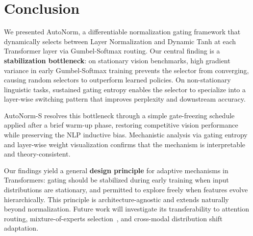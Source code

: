 \documentclass[conference]{IEEEtran}
\begin{document}
\section{Conclusion}

We presented AutoNorm, a differentiable normalization gating framework
that dynamically selects between Layer Normalization and Dynamic Tanh
at each Transformer layer via Gumbel-Softmax routing. Our central
finding is a \textbf{stabilization bottleneck}: on stationary vision
benchmarks, high gradient variance in early Gumbel-Softmax training
prevents the selector from converging, causing random selectors to
outperform learned policies. On non-stationary linguistic tasks,
sustained gating entropy enables the selector to specialize into a
layer-wise switching pattern that improves perplexity and downstream
accuracy.

AutoNorm-S resolves this bottleneck through a simple gate-freezing
schedule applied after a brief warm-up phase, restoring competitive
vision performance while preserving the NLP inductive bias. Mechanistic
analysis via gating entropy and layer-wise weight visualization
confirms that the mechanism is interpretable and theory-consistent.

Our findings yield a general \textbf{design principle} for adaptive
mechanisms in Transformers: gating should be stabilized during early
training when input distributions are stationary, and permitted to
explore freely when features evolve hierarchically. This principle is
architecture-agnostic and extends naturally beyond normalization.
Future work will investigate its transferability to attention routing,
mixture-of-experts selection~\cite{shazeer2017outrageously}, and
cross-modal distribution shift adaptation.
\end{document}
